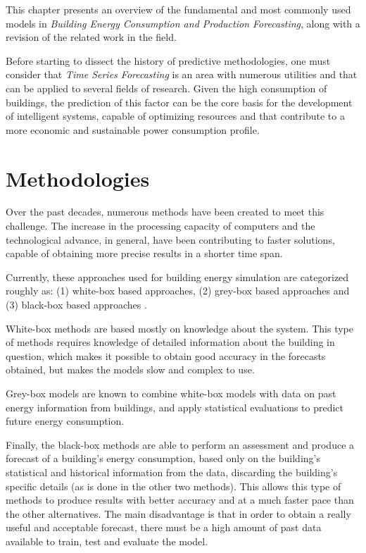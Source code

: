 \cleardoublepage
\label{chap:background}

This chapter presents an overview of the fundamental and most commonly used models in \textit{Building Energy Consumption and Production Forecasting}, along with a revision of the related work in the field.

Before starting to dissect the history of predictive methodologies, one must consider that \textit{Time Series Forecasting} is an area with numerous utilities and that can be applied to several fields of research. Given the high consumption of buildings, the prediction of this factor can be the core basis for the development of intelligent systems, capable of optimizing resources and that contribute to a more economic and sustainable power consumption profile.


\section{Methodologies\label{a}}

Over the past decades, numerous methods have been created to meet this challenge. The increase in the processing capacity of computers and the technological advance, in general, have been contributing to faster solutions, capable of obtaining more precise results in a shorter time span.

Currently, these approaches used for building energy simulation are categorized roughly as: (1) white-box based approaches, (2) grey-box based approaches and (3) black-box based approaches \cite{review2017}. 

White-box methods are based mostly on knowledge about the system. This type of methods requires knowledge of detailed information about the building in question, which makes it possible to obtain good accuracy in the forecasts obtained, but makes the models slow and complex to use.

Grey-box models are known to combine white-box models with data on past energy information from buildings, and apply statistical evaluations to predict future energy consumption.

Finally, the black-box methods are able to perform an assessment and produce a forecast of a building's energy consumption, based only on the building's statistical and historical information from the data, discarding the building's specific details (as is done in the other two methods). This allows this type of methods to produce results with better accuracy and at a much faster pace than the other alternatives. The main disadvantage is that in order to obtain a really useful and acceptable forecast, there must be a high amount of past data available to train, test and evaluate the model.

